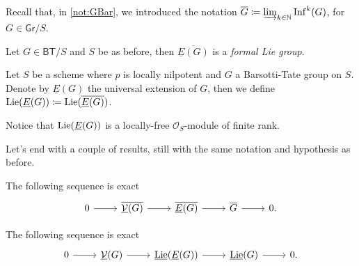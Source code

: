 \noindent
Recall that, in \cref{not:GBar}, we introduced the notation
$\overline{G} \coloneqq \varinjlim_{k \in \mathbb{N}} \operatorname{Inf}^k(G)$,
for $G \in \mathsf{Gr}/S$.


\begin{prop}\label{prop:ExtFLG}
	Let $G \in \mathsf{BT}/S$ and $S$ be as before,
	then $\overline{\underline{E}(G)}$ is a \emph{formal Lie group}.
\end{prop} 


\begin{defn}[]
	Let $S$ be a scheme where $p$ is locally nilpotent and $G$
	a Barsotti-Tate group on $S$.
	Denote by $\underline{E}(G)$ the universal extension of $G$, then we define
	$\operatorname{Lie}(\underline{E}(G)) \coloneqq \operatorname{Lie}(\overline{\underline{E}(G)})$.
\end{defn}


\begin{rem}[]
	Notice that $\operatorname{Lie}(\underline{E}(G))$ is a locally-free
	$\mathcal{O}_{ S }$-module of finite rank.
\end{rem}


\noindent
Let's end with a couple of results, still with the same notation and hypothesis as before.
\begin{prop}
	The following sequence is exact
	\begin{equation*}
	\begin{tikzcd}
		0 \arrow[r, "", rightarrow] &
		\overline{\underline{\mathcal{V}}(G)} \arrow[r, "", rightarrow] &
		\overline{\underline{E}(G)} \arrow[r, "", rightarrow] &
		\overline{G} \arrow[r, "", rightarrow] &
		0
	.\end{tikzcd}
	\end{equation*}
\end{prop} 


\begin{prop}\label{SESDieudonneCrystalEvaluation}
	The following sequence is exact
	\begin{equation*}
	\begin{tikzcd}
		0 \arrow[r, "", rightarrow] &
		\underline{\mathcal{V}}(G) \arrow[r, "", rightarrow] &
		\underline{\lie}(\underline{E}(G)) \arrow[r, "", rightarrow] &
		\underline{\lie}(G) \arrow[r, "", rightarrow] &
		0
	.\end{tikzcd}
	\end{equation*}
\end{prop} 



